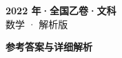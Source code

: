 \documentclass[zihao=-4, a4paper]{ctexart}
\begin{document}
\begin{center}
  {\Large\bfseries 2022 年·全国乙卷·文科}\\[4pt]
  {\large 数学 · 解析版}
\end{center}
\medskip
{}

\clearpage
{}
\begin{center}{\Large\bfseries 参考答案与详细解析}\end{center}
\medskip

\end{document}

